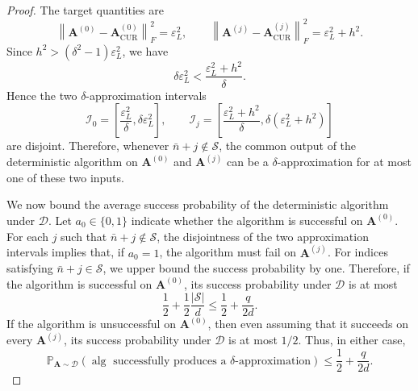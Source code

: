 \documentclass[10pt,a4paper]{amsart}
\begin{document}
\begin{proof}
    The target quantities are
    \begin{equation}
        \left\|
        \mathbf{A}^{(0)}-\mathbf{A}^{(0)}_{\mathrm{CUR}}
        \right\|_F^2
        =
        \varepsilon_L^2,
        \qquad
        \left\|
        \mathbf{A}^{(j)}-\mathbf{A}^{(j)}_{\mathrm{CUR}}
        \right\|_F^2
        =
        \varepsilon_L^2+h^2.
    \end{equation}
    Since
    $h^2>(\delta^2-1)\varepsilon_L^2$,
    we have
    \begin{equation}
        \delta\varepsilon_L^2
        <
        \frac{\varepsilon_L^2+h^2}{\delta}.
    \end{equation}
    Hence the two $\delta$-approximation intervals
    \begin{equation}
        \mathcal{I}_0
        =
        \left[
            \frac{\varepsilon_L^2}{\delta},
            \delta\varepsilon_L^2
            \right],
        \qquad
        \mathcal{I}_j
        =
        \left[
            \frac{\varepsilon_L^2+h^2}{\delta},
            \delta(\varepsilon_L^2+h^2)
            \right]
    \end{equation}
    are disjoint. Therefore, whenever $\bar n+j\notin\mathcal{S}$, the common
    output of the deterministic algorithm on $\mathbf{A}^{(0)}$ and
    $\mathbf{A}^{(j)}$ can be a $\delta$-approximation for at most one of these
    two inputs.

    We now bound the average success probability of the deterministic algorithm
    under $\mathcal{D}$. Let $a_0\in\{0,1\}$ indicate whether the algorithm is
    successful on $\mathbf{A}^{(0)}$. For each $j$ such that
    $\bar n+j\notin\mathcal{S}$, the disjointness of the two approximation
    intervals implies that, if $a_0=1$, the algorithm must fail on
    $\mathbf{A}^{(j)}$. For indices satisfying $\bar n+j\in\mathcal{S}$, we
    upper bound the success probability by one. Therefore, if the algorithm is
    successful on $\mathbf{A}^{(0)}$, its success probability under
    $\mathcal{D}$ is at most
    \begin{equation}
        \frac{1}{2}
        +
        \frac{1}{2}\frac{|\mathcal{S}|}{d}
        \leq
        \frac{1}{2}
        +
        \frac{q}{2d}.
    \end{equation}
    If the algorithm is unsuccessful on $\mathbf{A}^{(0)}$, then even assuming
    that it succeeds on every $\mathbf{A}^{(j)}$, its success probability under
    $\mathcal{D}$ is at most $1/2$. Thus, in either case,
    \begin{equation}
        \mathbb{P}_{\mathbf{A}\sim\mathcal{D}}
        \left(
        \operatorname{alg}\text{ successfully produces a }
        \delta\text{-approximation}
        \right)
        \leq
        \frac{1}{2}
        +
        \frac{q}{2d}.
    \end{equation}


\end{proof}
\end{document}
